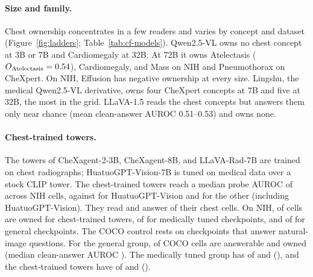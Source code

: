 \documentclass[11pt]{article}
\begin{document}
\paragraph{Size and family.} Chest ownership concentrates in a few readers and varies by concept and dataset (Figure~\ref{fig:ladders}; Table~\ref{tab:cf-models}). Qwen2.5-VL owns no chest concept at 3B or 7B and Cardiomegaly at 32B. At 72B it owns Atelectasis ($O_{\mathrm{Atelectasis}}=0.54$), Cardiomegaly, and Mass on NIH and Pneumothorax on CheXpert. On NIH, Effusion has negative ownership at every size. Lingshu, the medical Qwen2.5-VL derivative, owns four CheXpert concepts at 7B and five at 32B, the most in the grid. LLaVA-1.5 reads the chest concepts but answers them only near chance (mean clean-answer AUROC 0.51--0.53) and owns none.

\paragraph{Chest-trained towers.} The towers of CheXagent-2-3B, CheXagent-8B, and LLaVA-Rad-7B are trained on chest radiographs; HuatuoGPT-Vision-7B is tuned on medical data over a stock CLIP tower. The chest-trained towers reach a median probe AUROC of \cfSpecTowerProbeAuroc{} across \cfSpecTowerProbeN{} NIH cells, against \cfSpecStockProbeAuroc{} for HuatuoGPT-Vision and \cfSpecRestProbeAuroc{} for the other \cfSpecRestProbeN{} (including HuatuoGPT-Vision). They read \cfSpecTowerReadable{} and answer \cfSpecTowerAnswerable{} of their \cfSpecTowerN{} chest cells. On NIH, \cfSpecNihTowerOwned{} of \cfSpecNihTowerN{} cells are owned for chest-trained towers, \cfSpecNihMedOwned{} of \cfSpecNihMedN{} for medically tuned checkpoints, and \cfSpecNihGenOwned{} of \cfSpecNihGenN{} for general checkpoints. The COCO control rests on checkpoints that answer natural-image questions. For the general group, \cfSpecGenCocoAnswerable{} of \cfSpecGenCocoN{} COCO cells are answerable and \cfSpecGenCocoOwned{} owned (median clean-answer AUROC \cfSpecGenCocoAnsAuroc{}). The medically tuned group has \cfSpecMedCocoAnswerable{} of \cfSpecMedCocoN{} and \cfSpecMedCocoOwned{} (\cfSpecMedCocoAnsAuroc{}), and the chest-trained towers have \cfSpecTowerCocoAnswerable{} of \cfSpecTowerCocoN{} and \cfSpecTowerCocoOwned{} (\cfSpecTowerCocoAnsAuroc{}).
\end{document}
